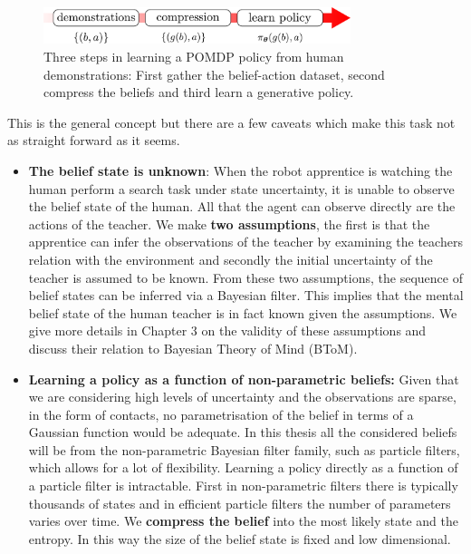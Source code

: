 \begin{figure}
 \centering
 \includegraphics[width=0.8\textwidth]{./ch2-Background/Figures/belief_pipeline.pdf}
 \caption{Three steps in learning a POMDP policy from human demonstrations: First gather the belief-action dataset, second compress the beliefs and third 
 learn a generative policy.}
 \label{fig:belief-pipeline}
\end{figure}

This is the general 
concept but there are a few caveats which make this task not as straight forward as it seems.

\begin{itemize}
 \item \textbf{The belief state is unknown}: When the robot apprentice is watching the human perform a search task under state uncertainty, it is 
 unable to observe the belief state of the human. All that the agent can observe directly are the actions of the teacher. We make \textbf{two assumptions}, the first 
 is that the apprentice can infer the observations of the teacher by examining the teachers relation with the environment and secondly the initial uncertainty of the 
 teacher is assumed to be known. From these two assumptions, the sequence of belief states can be inferred via a Bayesian filter. This implies that  the mental 
 belief state of the human teacher is in fact known given the assumptions. We give more details in Chapter 3 on the validity of these assumptions
 and discuss their relation to Bayesian Theory of Mind (BToM).
 
 \item \textbf{Learning a policy as a function of non-parametric beliefs:} Given that we are considering high levels of uncertainty and the 
 observations are sparse, in the form of contacts, no parametrisation of the belief in terms of a Gaussian function would be adequate. In this thesis all the considered beliefs will be from the non-parametric 
 Bayesian filter family, such as particle filters, which allows for a lot of flexibility. Learning a policy directly as a function of a particle filter is intractable. First 
 in non-parametric filters there is typically thousands of states and in efficient particle filters the number of parameters varies over time.
 We \textbf{compress the belief} into the most likely state and the entropy. In this way the size of the belief state is fixed and low dimensional.
\end{itemize}
 

